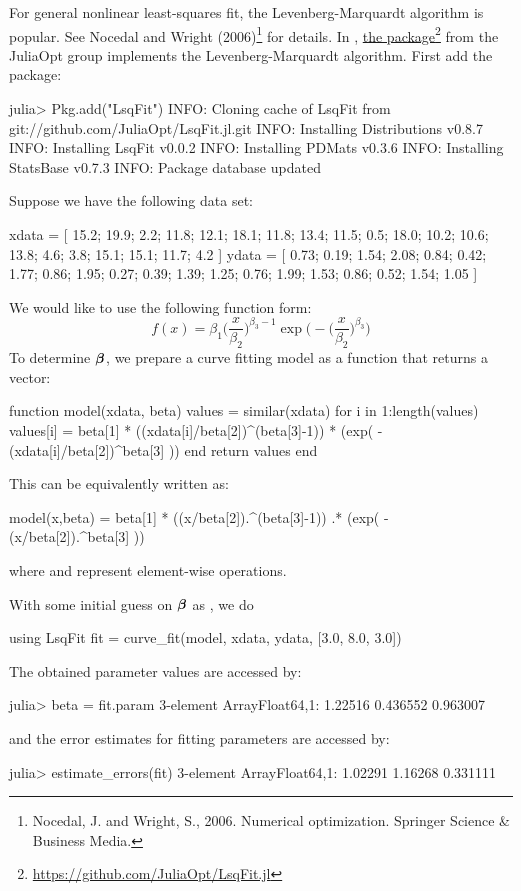 For general nonlinear least-squares fit, the Levenberg-Marquardt algorithm is popular. See Nocedal and Wright (2006)\footnote{Nocedal, J. and Wright, S., 2006. Numerical optimization. Springer Science \& Business Media.} for details. In \julia{}, \href{https://github.com/JuliaOpt/LsqFit.jl}{the  package}\footnote{\url{https://github.com/JuliaOpt/LsqFit.jl}} from the JuliaOpt group implements the Levenberg-Marquardt algorithm. First add the package:
\begin{code}
julia> Pkg.add("LsqFit")
INFO: Cloning cache of LsqFit from git://github.com/JuliaOpt/LsqFit.jl.git
INFO: Installing Distributions v0.8.7
INFO: Installing LsqFit v0.0.2
INFO: Installing PDMats v0.3.6
INFO: Installing StatsBase v0.7.3
INFO: Package database updated
\end{code}
Suppose we have the following data set:
\begin{code}
xdata = [ 15.2; 19.9;  2.2; 11.8; 12.1; 18.1; 11.8; 13.4; 11.5;  0.5;
          18.0; 10.2; 10.6; 13.8;  4.6;  3.8; 15.1; 15.1; 11.7;  4.2 ]
ydata = [ 0.73; 0.19; 1.54; 2.08; 0.84; 0.42; 1.77; 0.86; 1.95; 0.27;
          0.39; 1.39; 1.25; 0.76; 1.99; 1.53; 0.86; 0.52; 1.54; 1.05 ]
\end{code}
We would like to use the following function form:
\[
	f(x) = \beta_1 \bigg(\frac{x}{\beta_2}\bigg)^{\beta_3-1} \exp\Bigg( -\bigg(\frac{x}{\beta_2}\bigg)^{\beta_3} \Bigg)
\]
To determine $\boldsymbol{\beta}$, we prepare a curve fitting model as a function that returns a vector:
\begin{code}
function model(xdata, beta)
	values = similar(xdata)
	for i in 1:length(values)
		values[i] = beta[1] * ((xdata[i]/beta[2])^(beta[3]-1))
                            * (exp( - (xdata[i]/beta[2])^beta[3] ))
	end
	return values
end
\end{code}
\noindent This can be equivalently written as:
\begin{code}
model(x,beta) = beta[1] * ((x/beta[2]).^(beta[3]-1)) .*
                          (exp( - (x/beta[2]).^beta[3] ))
\end{code}
\noindent where  and  represent element-wise operations.

With some initial guess on $\boldsymbol{\beta}$ as \kode{[3.0, 8.0, 3.0]}, we do
\begin{code}
using LsqFit
fit = curve_fit(model, xdata, ydata, [3.0, 8.0, 3.0])
\end{code}
\noindent The obtained parameter values are accessed by:
\begin{code}
julia> beta = fit.param
3-element Array{Float64,1}:
 1.22516
 0.436552
 0.963007
\end{code}
\noindent and the error estimates for fitting parameters are accessed by:
\begin{code}
julia> estimate_errors(fit)
3-element Array{Float64,1}:
 1.02291
 1.16268
 0.331111
\end{code}

